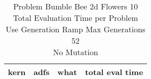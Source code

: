 \begin{table}[H]
\caption{Problem  Bumble Bee 2d  Flowers 10\\Total Evaluation Time per Problem \\ Use Generation Ramp  Max Generations 52\\ No Mutation \\}
\begin{center}
\scalebox{1.0} %
{
\begin{tabular}{lllr}
\hline
kern & adfs & what & total eval time \\
\hline


\end{tabular}
}
\end{center}
\end{table}

